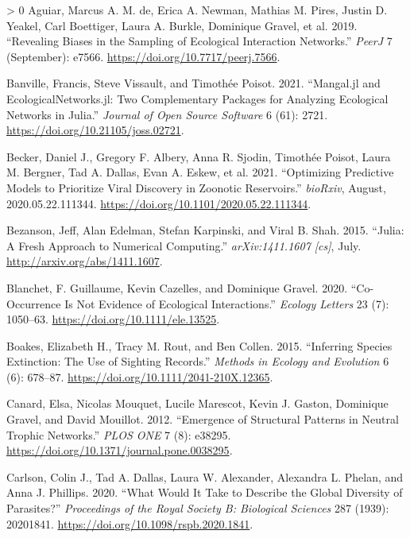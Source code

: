\documentclass[11pt]{article}
\newlength{\cslhangindent}
\newenvironment{CSLReferences}[3] %
 {%
  \setlength{\parindent}{0pt}
  \ifodd #1 \everypar{\setlength{\hangindent}{\cslhangindent}}\ignorespaces\fi
  \ifnum #2 > 0
  \setlength{\parskip}{#2\baselineskip}
  \fi
 }%
 {}
\begin{document}
\hypertarget{refs}{}
\begin{CSLReferences}{1}{0}
\leavevmode\hypertarget{ref-deAguiar2019RevBia}{}%
Aguiar, Marcus A. M. de, Erica A. Newman, Mathias M. Pires, Justin D.
Yeakel, Carl Boettiger, Laura A. Burkle, Dominique Gravel, et al. 2019.
{``Revealing Biases in the Sampling of Ecological Interaction
Networks.''} \emph{PeerJ} 7 (September): e7566.
\url{https://doi.org/10.7717/peerj.7566}.

\leavevmode\hypertarget{ref-Banville2021ManJl}{}%
Banville, Francis, Steve Vissault, and Timothée Poisot. 2021.
{``Mangal.jl and EcologicalNetworks.jl: Two Complementary Packages for
Analyzing Ecological Networks in Julia.''} \emph{Journal of Open Source
Software} 6 (61): 2721. \url{https://doi.org/10.21105/joss.02721}.

\leavevmode\hypertarget{ref-Becker2021OptPre}{}%
Becker, Daniel J., Gregory F. Albery, Anna R. Sjodin, Timothée Poisot,
Laura M. Bergner, Tad A. Dallas, Evan A. Eskew, et al. 2021.
{``Optimizing Predictive Models to Prioritize Viral Discovery in
Zoonotic Reservoirs.''} \emph{bioRxiv}, August, 2020.05.22.111344.
\url{https://doi.org/10.1101/2020.05.22.111344}.

\leavevmode\hypertarget{ref-Bezanson2015JulFre}{}%
Bezanson, Jeff, Alan Edelman, Stefan Karpinski, and Viral B. Shah. 2015.
{``Julia: A Fresh Approach to Numerical Computing.''}
\emph{arXiv:1411.1607 {[}cs{]}}, July.
\url{http://arxiv.org/abs/1411.1607}.

\leavevmode\hypertarget{ref-Blanchet2020CooNot}{}%
Blanchet, F. Guillaume, Kevin Cazelles, and Dominique Gravel. 2020.
{``Co-Occurrence Is Not Evidence of Ecological Interactions.''}
\emph{Ecology Letters} 23 (7): 1050--63.
\url{https://doi.org/10.1111/ele.13525}.

\leavevmode\hypertarget{ref-Boakes2015InfSpe}{}%
Boakes, Elizabeth H., Tracy M. Rout, and Ben Collen. 2015. {``Inferring
Species Extinction: The Use of Sighting Records.''} \emph{Methods in
Ecology and Evolution} 6 (6): 678--87.
\url{https://doi.org/10.1111/2041-210X.12365}.

\leavevmode\hypertarget{ref-Canard2012EmeStr}{}%
Canard, Elsa, Nicolas Mouquet, Lucile Marescot, Kevin J. Gaston,
Dominique Gravel, and David Mouillot. 2012. {``Emergence of Structural
Patterns in Neutral Trophic Networks.''} \emph{PLOS ONE} 7 (8): e38295.
\url{https://doi.org/10.1371/journal.pone.0038295}.

\leavevmode\hypertarget{ref-Carlson2020WhaWou}{}%
Carlson, Colin J., Tad A. Dallas, Laura W. Alexander, Alexandra L.
Phelan, and Anna J. Phillips. 2020. {``What Would It Take to Describe
the Global Diversity of Parasites?''} \emph{Proceedings of the Royal
Society B: Biological Sciences} 287 (1939): 20201841.
\url{https://doi.org/10.1098/rspb.2020.1841}.


\end{CSLReferences}
\end{document}
